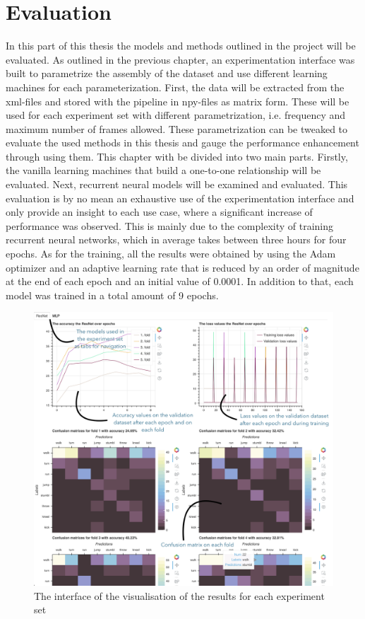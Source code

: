 \chapter{Evaluation}\label{chap:evaluation}
	In this part of this thesis the models and methods outlined in the project will be evaluated. As outlined in the previous chapter, an experimentation interface was built to parametrize the assembly of the dataset and use different learning machines for each parameterization. First, the data will be extracted from the xml-files and stored with the pipeline in npy-files as matrix form. These will be used for each experiment set with different parametrization, i.e. frequency and maximum number of frames allowed. These parametrization can be tweaked to evaluate the used methods in this thesis and gauge the performance enhancement through using them.\newline
	This chapter with be divided into two main parts. Firstly, the vanilla learning machines that build a one-to-one relationship will be evaluated. Next, recurrent neural models will be examined and evaluated. This evaluation is by no mean an exhaustive use of the experimentation interface and only provide an insight to each use case, where a significant increase of performance was observed. This is mainly due to the complexity of training recurrent neural networks, which in average takes between three hours for four epochs.\newline
	As for the training, all the results were obtained by using the Adam optimizer and an adaptive learning rate that is reduced by an order of magnitude at the end of each epoch and an initial value of 0.0001. In addition to that, each model was trained in a total amount of 9 epochs.\newline
	\begin{figure}[H]
		\centering
		\includegraphics[width=\textwidth]{img/the-interface-of-the-visualisation-of-the-results-for-each-experiment-set.png}
		\caption{The interface of the visualisation of the results for each experiment set}
		\label{fig:vis_example}
	\end{figure}
